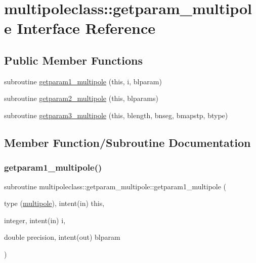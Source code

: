 \hypertarget{interfacemultipoleclass_1_1getparam__multipole}{}\section{multipoleclass\+::getparam\+\_\+multipole Interface Reference}
\label{interfacemultipoleclass_1_1getparam__multipole}
\subsection*{Public Member Functions}
\begin{DoxyCompactItemize}
\item 
subroutine \mbox{\hyperlink{interfacemultipoleclass_1_1getparam__multipole_aa21501c937450338a463ec782b897fa1}{getparam1\+\_\+multipole}} (this, i, blparam)
\item 
subroutine \mbox{\hyperlink{interfacemultipoleclass_1_1getparam__multipole_a2aaeb8e25084463ca88ee950e1a22991}{getparam2\+\_\+multipole}} (this, blparams)
\item 
subroutine \mbox{\hyperlink{interfacemultipoleclass_1_1getparam__multipole_ae7de82d65165d1d0733e90e40ec032f7}{getparam3\+\_\+multipole}} (this, blength, bnseg, bmapstp, btype)
\end{DoxyCompactItemize}


\subsection{Member Function/\+Subroutine Documentation}
\mbox{\label{interfacemultipoleclass_1_1getparam__multipole_aa21501c937450338a463ec782b897fa1}} 
\subsubsection{\texorpdfstring{getparam1\_multipole()}{getparam1\_multipole()}}
{\footnotesize\ttfamily subroutine multipoleclass\+::getparam\+\_\+multipole\+::getparam1\+\_\+multipole (\begin{DoxyParamCaption}\item[{type (\mbox{\hyperlink{namespacemultipoleclass_structmultipoleclass_1_1multipole}{multipole}}), intent(in)}]{this,  }\item[{integer, intent(in)}]{i,  }\item[{double precision, intent(out)}]{blparam }\end{DoxyParamCaption})}

